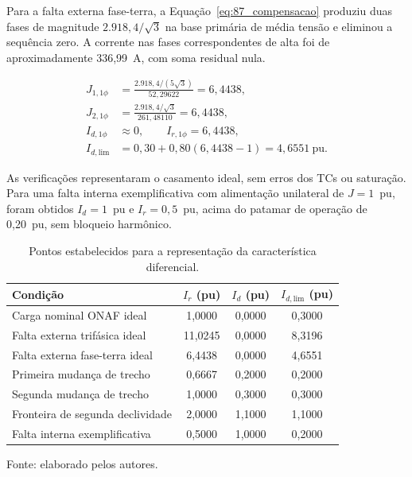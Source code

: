 Para a falta externa fase-terra, a Equação~\eqref{eq:87_compensacao} produziu duas fases de magnitude $2.918{,}4/\sqrt{3}$ na base primária de média tensão e eliminou a sequência zero. A corrente nas fases correspondentes de alta foi de aproximadamente 336,99~A, com soma residual nula.

\begin{equation}
    \begin{aligned}
        J_{1,1\phi}&=\frac{2.918{,}4/(5\sqrt{3})}{52{,}29622}=6{,}4438,\\
        J_{2,1\phi}&=\frac{2.918{,}4/\sqrt{3}}{261{,}48110}=6{,}4438,\\
        I_{d,1\phi}&\approx0,\qquad I_{r,1\phi}=6{,}4438,\\
        I_{d,\mathrm{lim}}&=0{,}30+0{,}80(6{,}4438-1)
        =4{,}6551~\mathrm{pu}.
    \end{aligned}
    \label{eq:87_verificacao_terra}
\end{equation}

As verificações representaram o casamento ideal, sem erros dos TCs ou saturação. Para uma falta interna exemplificativa com alimentação unilateral de $J=1$~pu, foram obtidos $I_d=1$~pu e $I_r=0{,}5$~pu, acima do patamar de operação de 0,20~pu, sem bloqueio harmônico.

\begin{table}[htbp]
    \centering
    \caption{Pontos estabelecidos para a representação da característica diferencial.}
    \label{tab:87_pontos_curva}
    \begin{tabular}{lccc}
        \hline
        \textbf{Condição} & \textbf{$I_r$ (pu)}
        & \textbf{$I_d$ (pu)} & \textbf{$I_{d,\mathrm{lim}}$ (pu)}\\
        \hline
        Carga nominal ONAF ideal & 1,0000 & 0,0000 & 0,3000\\
        Falta externa trifásica ideal & 11,0245 & 0,0000 & 8,3196\\
        Falta externa fase-terra ideal & 6,4438 & 0,0000 & 4,6551\\
        Primeira mudança de trecho & 0,6667 & 0,2000 & 0,2000\\
        Segunda mudança de trecho & 1,0000 & 0,3000 & 0,3000\\
        Fronteira de segunda declividade & 2,0000 & 1,1000 & 1,1000\\
        Falta interna exemplificativa & 0,5000 & 1,0000 & 0,2000\\
        \hline
    \end{tabular}
    \par\vspace{2pt}
    {\small Fonte: elaborado pelos autores.}
\end{table}

